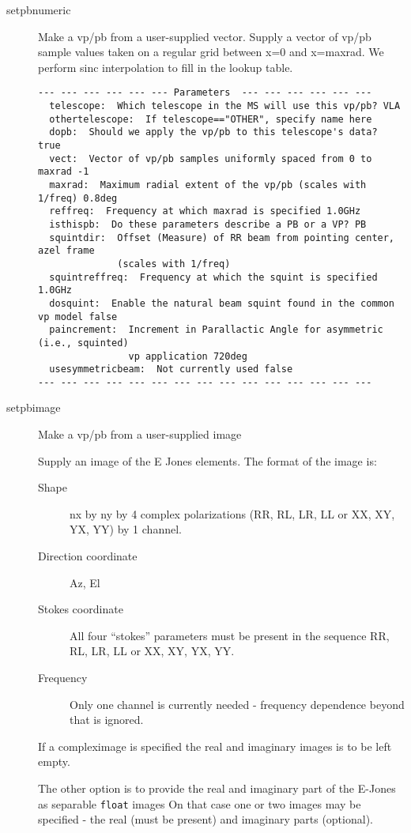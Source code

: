 \documentclass[12pt]{article}
\begin{document}
\begin{description}
 
  \item[setpbnumeric]
   Make a vp/pb from a user-supplied vector.
   Supply a vector of vp/pb sample values taken on a regular grid between x=0 and
   x=maxrad.  We perform sinc interpolation to fill in the lookup table.

{\small
\begin{verbatim}
--- --- --- --- --- --- Parameters  --- --- --- --- --- ---
  telescope:  Which telescope in the MS will use this vp/pb? VLA 
  othertelescope:  If telescope=="OTHER", specify name here 
  dopb:  Should we apply the vp/pb to this telescope's data? true 
  vect:  Vector of vp/pb samples uniformly spaced from 0 to maxrad -1 
  maxrad:  Maximum radial extent of the vp/pb (scales with 1/freq) 0.8deg 
  reffreq:  Frequency at which maxrad is specified 1.0GHz 
  isthispb:  Do these parameters describe a PB or a VP? PB 
  squintdir:  Offset (Measure) of RR beam from pointing center, azel frame 
              (scales with 1/freq) 
  squintreffreq:  Frequency at which the squint is specified 1.0GHz 
  dosquint:  Enable the natural beam squint found in the common vp model false 
  paincrement:  Increment in Parallactic Angle for asymmetric (i.e., squinted) 
                vp application 720deg 
  usesymmetricbeam:  Not currently used false 
--- --- --- --- --- --- --- --- --- --- --- --- --- --- ---
\end{verbatim} 
} 

 
  \item[setpbimage]
   Make a vp/pb from a user-supplied image

   Supply an image of the E Jones elements. The format of the 
   image is:
   \begin{description}
   \item[Shape] nx by ny by 4 complex polarizations (RR, RL, LR, LL or
     XX, XY, YX, YY) by 1 channel.
   \item[Direction coordinate] Az, El
   \item[Stokes coordinate] All four ``stokes'' parameters must be present
     in the sequence RR, RL, LR, LL or XX, XY, YX, YY.
   \item[Frequency] Only one channel is currently needed - frequency 
     dependence beyond that is ignored. 
   \end{description}

   If a compleximage is specified the real and imaginary images is to be left empty.

   The other option is to provide the real and imaginary part of the E-Jones as separable {\tt float} images
   On that case
   one or two images may be specified - the real (must be present) and
   imaginary parts (optional). 


\end{description}
\end{document}
